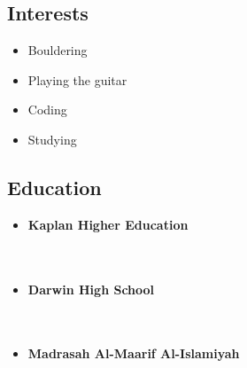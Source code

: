 \documentclass[11pt,oneside,a4paper,titlepage]{article}
\begin{document}
\begin{tcolorbox}
\begin{minipage}[t]{8cm}
\begin{tcolorbox}[grow to left by=0.6cm,colback=gray!25,colframe=white]
\section*{Interests}
\begin{itemize}
    \item {Bouldering}
    \item {Playing the guitar}
    \item {Coding}
    \item {Studying}
\end{itemize}
\end{tcolorbox}
\end{minipage}
\end{tcolorbox}
\hfill \begin{minipage}[t]{11cm}
\begin{tcolorbox}[grow to right by=0.75cm,colframe=white,colback=white]
\section*{Education}
\begin{itemize}
\item
{\textbf{Kaplan Higher Education}\\
\\
\\}
\item
{\textbf{Darwin High School}\\
\\
\\}
\item
{\textbf{Madrasah Al-Maarif Al-Islamiyah}\\
\\
\\}
\end{itemize}

\end{tcolorbox}
\end{minipage}
\end{document}

